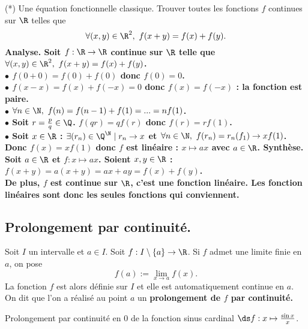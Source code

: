 \documentclass[11pt]{article}
\begin{document}
\begin{ex}{(*) Une équation fonctionnelle classique.}{}
    Trouver toutes les fonctions $f$ continues sur $\R$ telles que
    \begin{equation*}
        \forall (x,y) \in \R^2, ~ f(x+y)=f(x)+f(y).
    \end{equation*}
    \tcblower
    \bf{Analyse.} Soit $f:\R\to\R$ continue sur $\R$ telle que $\forall (x,y)\in\R^2,~f(x+y)=f(x)+f(y)$.\\
    $\bullet$ $f(0+0)=f(0)+f(0)$ donc $f(0)=0$.\\
    $\bullet$ $f(x-x)=f(x)+f(-x)=0$ donc $f(x)=f(-x)$ : la fonction est paire.\\
    $\bullet$ $\forall n \in \N, ~ f(n)=f(n-1)+f(1)=...=nf(1)$.\\
    $\bullet$ Soit $r=\frac{p}{q}\in\Q$. $f(qr)=qf(r)$ donc $f(r)=rf(1)$.\\
    $\bullet$ Soit $x\in\R$ : $\exists (r_n)\in\Q^\N\mid r_n\to x$ et $\forall n \in \N,~f(r_n)=r_n(f_1)\to xf(1)$.\\
    Donc $f(x)=xf(1)$ donc $f$ est linéaire : $x\mapsto ax$ avec $a\in\R$.\n
    \bf{Synthèse.} Soit $a\in\R$ et $f:x\mapsto ax$. Soient $x,y\in\R$ : $f(x+y)=a(x+y)=ax + ay=f(x)+f(y)$.\\
    De plus, $f$ est continue sur $\R$, c'est une fonction linéaire. Les fonction linéaires sont donc les seules fonctions qui conviennent.
\end{ex}

\subsection{Prolongement par continuité.}

\begin{defi}{}{}
    Soit $I$ un intervalle et $a\in I$. Soit $f:I\setminus\{a\}\to\R$. Si $f$ admet une limite finie en $a$, on pose
    \begin{equation*}
        f(a) := \lim_{x\to a}f(x).
    \end{equation*} 
    La fonction $f$ est alors définie sur $I$ et elle est automatiquement continue en $a$. On dit que l'on a réalisé au point $a$ un \bf{prolongement de $f$ par continuité.}
\end{defi}

\begin{ex}{}{}
    Prolongement par continuité en 0 de la fonction sinus cardinal $\ds f:x\mapsto\frac{\sin x}{x}$.
\end{ex}
\end{document}
